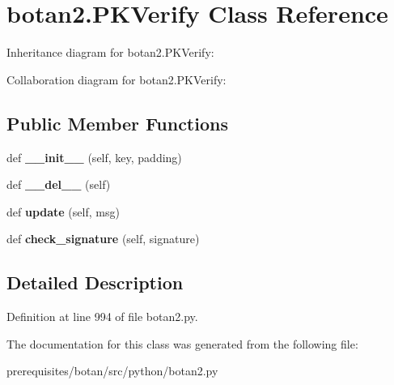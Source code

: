 \hypertarget{classbotan2_1_1_p_k_verify}{}\section{botan2.\+P\+K\+Verify Class Reference}
\label{classbotan2_1_1_p_k_verify}


Inheritance diagram for botan2.\+P\+K\+Verify\+:


Collaboration diagram for botan2.\+P\+K\+Verify\+:
\subsection*{Public Member Functions}
\begin{DoxyCompactItemize}
\item 
\mbox{\label{classbotan2_1_1_p_k_verify_ab5cf8109f08caa6bf3136e2bd09d6b0e}} 
def {\bfseries \+\_\+\+\_\+init\+\_\+\+\_\+} (self, key, padding)
\item 
\mbox{\label{classbotan2_1_1_p_k_verify_a7edb74b4d604ded10dc367d80d1cf3b5}} 
def {\bfseries \+\_\+\+\_\+del\+\_\+\+\_\+} (self)
\item 
\mbox{\label{classbotan2_1_1_p_k_verify_afa036a897a49ce7dacdea85e454fcc36}} 
def {\bfseries update} (self, msg)
\item 
\mbox{\label{classbotan2_1_1_p_k_verify_a98be88016bbe0ea9cfa1c708363a1544}} 
def {\bfseries check\+\_\+signature} (self, signature)
\end{DoxyCompactItemize}


\subsection{Detailed Description}


Definition at line 994 of file botan2.\+py.



The documentation for this class was generated from the following file\+:\begin{DoxyCompactItemize}
\item 
prerequisites/botan/src/python/botan2.\+py\end{DoxyCompactItemize}
